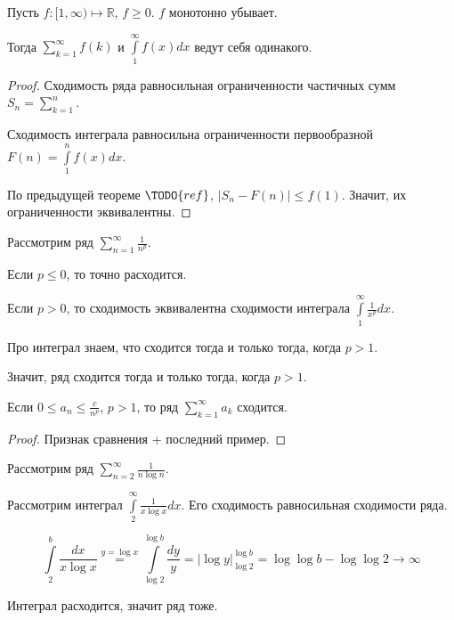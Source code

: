 \begin{theorem} \thmslashn

    Пусть $f : [1, \infty) \mapsto \mathbb{R}$, $f \ge 0$. $f$ монотонно убывает.

    Тогда $\sum\limits_{k=1}^{\infty} f(k)$ и $\int\limits_{1}^{\infty} f(x)dx$ ведут себя одинакого.
    \begin{proof} \thmslashn
    
        Сходимость ряда равносильная ограниченности частичных сумм $S_{n} = \sum\limits_{k=1}^{n}$.

        Сходимость интеграла равносильна ограниченности первообразной $F(n) = \int\limits_{1}^{n} f(x)dx$.

        По предыдущей теореме $\TODO{ref}$, $|S_{n} - F(n)| \le f(1)$. Значит, их ограниченности эквивалентны.
    \end{proof}
\end{theorem}
\begin{example} \thmslashn

    Рассмотрим ряд $\sum\limits_{n=1}^{\infty} \frac{1}{n^{p}}$.

    Если $p\le 0$, то точно расходится.

    Если $p>0$, то сходимость эквивалентна сходимости интеграла $\int\limits_{1}^{\infty} \frac{1}{x^{p}}dx$.

    Про интеграл знаем, что сходится тогда и только тогда, когда $p > 1$.

    Значит, ряд сходится тогда и только тогда, когда $p > 1$.
\end{example}
\begin{consequence} \thmslashn

    Если $0 \le a_{n} \le \frac{c}{n^{p}}$, $p>1$, то ряд $\sum\limits_{k=1}^{\infty} a_{k}$ сходится.
    \begin{proof} \thmslashn
    
        Признак сравнения + последний пример.
    \end{proof}
\end{consequence}
\begin{example} \thmslashn

    Рассмотрим ряд $\sum\limits_{n=2}^{\infty} \frac{1}{n\log n}$.

    Рассмотрим интеграл $\int\limits_{2}^{\infty}  \frac{1}{x\log x}dx$. Его сходимость равносильная сходимости ряда.

    \begin{equation*}
        \int\limits_{2}^{b} \frac{dx}{x\log x} \overset{y=\log x}{=} \int\limits_{\log 2}^{\log b} \frac{dy}{y} = \left| \log y\right|_{\log 2}^{\log b} = \log \log b - \log\log 2 \to \infty
    \end{equation*}

    Интеграл расходится, значит ряд тоже.
\end{example}
